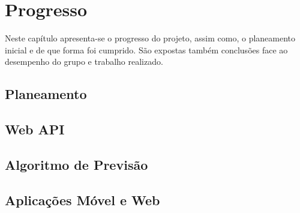%
%
\chapter{Progresso} \label{cap4}

Neste capítulo apresenta-se o progresso do projeto, assim como, o planeamento inicial e de que forma foi cumprido. São  expostas também conclusões face ao desempenho do grupo e trabalho realizado.

\section{Planeamento}\label{sec41}

\section{Web API}\label{sec42}

\section{Algoritmo de Previsão}\label{sec43}

\section{Aplicações Móvel e Web}\label{sec44}












